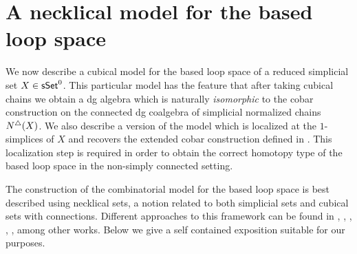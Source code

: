 \section{A necklical model for the based loop space}

We now describe a cubical model for the based loop space of a reduced simplicial set $X \in \mathsf{sSet}^0$. This particular model has the feature that after taking cubical chains we obtain a dg algebra which is naturally \textit{isomorphic} to the cobar construction on the connected dg coalgebra of simplicial normalized chains $N^{\triangle}(X)$. We also describe a version of the model which is localized at the $1$-simplices of $X$ and recovers the extended cobar construction defined in \cite{hess2010cobar}. This localization step is required in order to obtain the correct homotopy type of the based loop space in the non-simply connected setting.

The construction of the combinatorial model for the based loop space is best described using necklical sets, a notion related to both simplicial sets and cubical sets with connections. Different approaches to this framework can be found in \cite{baues1998hopf}, \cite{galvez2020hopf}, \cite{dugger2011rigidification}, \cite{rivera2018cubical}, \cite{rivera2018cubical}, among other works. Below we give a self contained exposition suitable for our purposes. 



